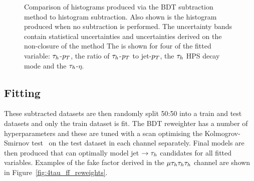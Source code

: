 \begin{figure}[!hbtp]
\caption{Comparison of histograms produced via the BDT subtraction method to histogram subtraction. Also shown is the histogram produced when no subtraction is performed. The uncertainty bands contain statistical uncertainties and uncertainties derived on the non-closure of the method The is shown for four of the fitted variable: $\tau_{h}$-$p_{T}$, the ratio of $\tau_{h}$-$p_{T}$ to jet-$p_{T}$, the $\tau_{h}$ HPS decay mode and the $\tau_{h}$-$\eta$.}
\label{fig:4tau_ff_subtraction}
\end{figure}

\subsection{Fitting}

These subtracted datasets are then randomly split 50:50 into a train and test datasets and only the train dataset is fit. 
The \ac{BDT} reweighter has a number of hyperparameters and these are tuned with a scan optimising the Kolmogrov-Smirnov test~\cite{16e7f618-c06b-3d10-8705-1086b218d827} on the test dataset in each channel separately.
Final models are then produced that can optimally model jet $\rightarrow\tau_{h}$ candidates for all fitted variables. 
Examples of the fake factor derived in the $\mu\tau_{h}\tau_{h}\tau_{h}$ channel are shown in Figure~\ref{fig:4tau_ff_reweights}. \\

